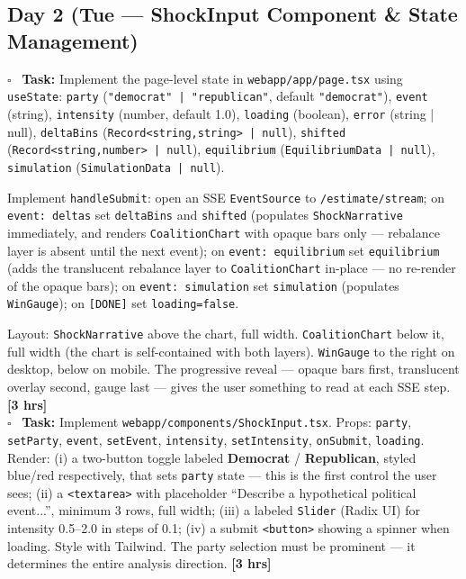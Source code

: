 \documentclass[11pt]{article}
\newcommand{\hrs}[1]{\textbf{[#1 hrs]}}
\newcommand{\dayhead}[2]{%
  \subsection*{Day #1 \normalfont\small\color{codegray}(#2)}}
\newcommand{\task}[2]{%
  \noindent\textbf{Task:} #1 \hfill \hrs{#2}\\}
\newcommand{\done}{\textcolor{sectionblue}{$\square$}\ }
\begin{document}
\dayhead{2}{Tue --- ShockInput Component \& State Management}

\begin{taskbox}
\done \task{Implement the page-level state in \texttt{webapp/app/page.tsx}
  using \texttt{useState}: \texttt{party} (\texttt{"democrat" | "republican"},
  default \texttt{"democrat"}), \texttt{event} (string), \texttt{intensity}
  (number, default 1.0), \texttt{loading} (boolean), \texttt{error}
  (string | null), \texttt{deltaBins} (\texttt{Record<string,string> | null}),
  \texttt{shifted} (\texttt{Record<string,number> | null}),
  \texttt{equilibrium} (\texttt{EquilibriumData | null}),
  \texttt{simulation} (\texttt{SimulationData | null}).

  Implement \texttt{handleSubmit}: open an SSE \texttt{EventSource} to
  \texttt{/estimate/stream}; on \texttt{event: deltas} set \texttt{deltaBins}
  and \texttt{shifted} (populates \texttt{ShockNarrative} immediately, and
  renders \texttt{CoalitionChart} with opaque bars only --- rebalance layer
  is absent until the next event); on \texttt{event: equilibrium} set
  \texttt{equilibrium} (adds the translucent rebalance layer to
  \texttt{CoalitionChart} in-place --- no re-render of the opaque bars);
  on \texttt{event: simulation} set \texttt{simulation} (populates
  \texttt{WinGauge}); on \texttt{[DONE]} set \texttt{loading=false}.

  Layout: \texttt{ShockNarrative} above the chart, full width.
  \texttt{CoalitionChart} below it, full width (the chart is self-contained
  with both layers). \texttt{WinGauge} to the right on desktop, below on
  mobile. The progressive reveal --- opaque bars first, translucent overlay
  second, gauge last --- gives the user something to read at each SSE step.}{3}

\done \task{Implement \texttt{webapp/components/ShockInput.tsx}. Props:
  \texttt{party}, \texttt{setParty}, \texttt{event}, \texttt{setEvent},
  \texttt{intensity}, \texttt{setIntensity}, \texttt{onSubmit},
  \texttt{loading}. Render: (i) a two-button toggle labeled
  \textbf{Democrat} / \textbf{Republican}, styled blue/red respectively,
  that sets \texttt{party} state --- this is the first control the user sees;
  (ii) a \texttt{<textarea>} with placeholder ``Describe a hypothetical
  political event...'', minimum 3 rows, full width; (iii) a labeled
  \texttt{Slider} (Radix UI) for intensity 0.5--2.0 in steps of 0.1;
  (iv) a submit \texttt{<button>} showing a spinner when loading.
  Style with Tailwind. The party selection must be prominent --- it
  determines the entire analysis direction.}{3}


\end{taskbox}
\end{document}
